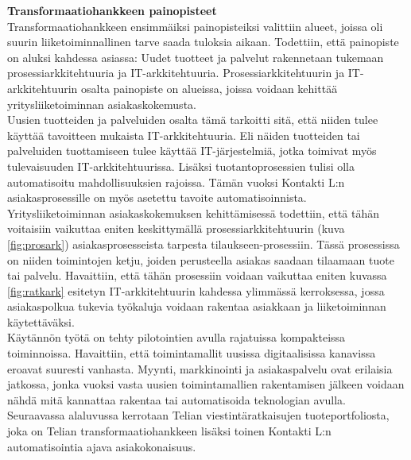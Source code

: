 \documentclass[finnish,12pt,a4paper,pdftex]{article}
\begin{document}
\textbf{Transformaatiohankkeen painopisteet}\\

Transformaatiohankkeen ensimmäiksi painopisteiksi valittiin alueet, joissa oli suurin liiketoiminnallinen tarve saada tuloksia aikaan. Todettiin, että painopiste on aluksi kahdessa asiassa: Uudet tuotteet ja palvelut rakennetaan tukemaan prosessiarkkitehtuuria ja IT-arkkitehtuuria. Prosessiarkkitehtuurin ja IT-arkkitehtuurin osalta painopiste on alueissa, joissa voidaan kehittää yritysliiketoiminnan asiakaskokemusta.\\

Uusien tuotteiden ja palveluiden osalta tämä tarkoitti sitä, että niiden tulee käyttää tavoitteen mukaista IT-arkkitehtuuria. Eli näiden tuotteiden tai palveluiden tuottamiseen tulee käyttää IT-järjestelmiä, jotka toimivat myös tulevaisuuden IT-arkkitehtuurissa. Lisäksi tuotantoprosessien tulisi olla automatisoitu mahdollisuuksien rajoissa. Tämän vuoksi Kontakti L:n asiakasprosessille on myös asetettu tavoite automatisoinnista.\\

Yritysliiketoiminnan asiakaskokemuksen kehittämisessä todettiin, että tähän voitaisiin vaikuttaa eniten keskittymällä prosessiarkkitehtuurin (kuva \ref{fig:prosark}) asiakasprosesseista tarpesta tilaukseen-prosessiin. Tässä prosessissa on niiden toimintojen ketju, joiden perusteella asiakas saadaan tilaamaan tuote tai palvelu. Havaittiin, että tähän prosessiin voidaan vaikuttaa eniten kuvassa \ref{fig:ratkark} esitetyn IT-arkkitehtuurin kahdessa ylimmässä kerroksessa, jossa asiakaspolkua tukevia työkaluja voidaan rakentaa asiakkaan ja liiketoiminnan käytettäväksi.\\

Käytännön työtä on tehty pilotointien avulla rajatuissa kompakteissa toiminnoissa. Havaittiin, että toimintamallit uusissa digitaalisissa kanavissa eroavat suuresti vanhasta. Myynti, markkinointi ja asiakaspalvelu ovat erilaisia jatkossa, jonka vuoksi vasta uusien toimintamallien rakentamisen jälkeen voidaan nähdä mitä kannattaa rakentaa tai automatisoida teknologian avulla.\\

Seuraavassa alaluvussa kerrotaan Telian viestintäratkaisujen tuoteportfoliosta, joka on Telian transformaatiohankkeen lisäksi toinen Kontakti L:n automatisointia ajava asiakokonaisuus.

\end{document}
